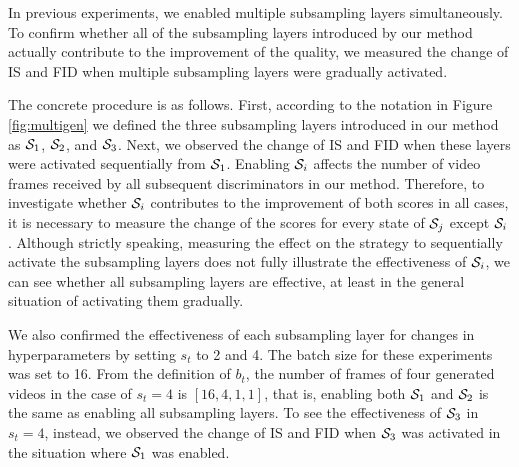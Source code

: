 \documentclass[twocolumn]{svjour3}
\def\Fig#1{Figure \ref{fig:#1}}
\begin{document}
In previous experiments, we enabled multiple subsampling layers simultaneously.
To confirm whether all of the subsampling layers introduced by our method
actually contribute to the improvement of the quality,
we measured the change of IS and FID
when multiple subsampling layers were gradually activated.












The concrete procedure is as follows.
First, according to the notation in \Fig{multigen}
we defined the three subsampling layers introduced in our method as
${\cal S}_1$, ${\cal S}_2$, and ${\cal S}_3$.
Next, we observed the change of IS and FID
when these layers were activated sequentially from ${\cal S}_1$.
Enabling ${\cal S}_i$ affects the number of video frames
received by all subsequent discriminators in our method.
Therefore, to investigate whether ${\cal S}_i$ contributes to
the improvement of both scores in all cases,
it is necessary to measure the change of the scores
for every state of ${\cal S}_j$ except ${\cal S}_i$.
Although strictly speaking,
measuring the effect on the strategy to sequentially activate the subsampling layers
does not fully illustrate the effectiveness of ${\cal S}_i$,
we can see whether all subsampling layers are effective,
at least in the general situation of activating them gradually.









We also confirmed the effectiveness of each subsampling layer for changes
in hyperparameters by setting $s_t$ to 2 and 4.
The batch size for these experiments was set to 16.
From the definition of $b_t$, the number of frames of four generated videos
in the case of $s_t=4$ is $[16,4,1,1]$, that is, enabling both ${\cal S}_1$
and ${\cal S}_2$ is the same as enabling all subsampling layers.
To see the effectiveness of ${\cal S}_3$ in $s_t=4$, instead,
we observed the change of IS and FID when ${\cal S}_3$ was activated
in the situation where ${\cal S}_1$ was enabled.
\end{document}

